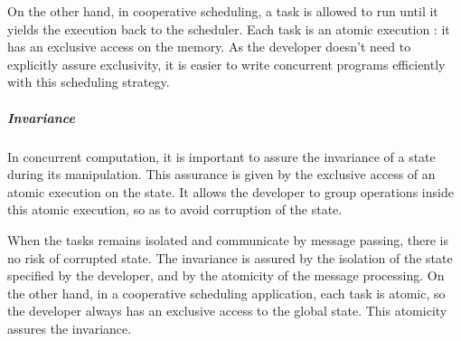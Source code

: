 On the other hand, in cooperative scheduling, a task is allowed to run until it yields the execution back to the scheduler.
Each task is an atomic execution : it has an exclusive access on the memory.
As the developer doesn't need to explicitly assure exclusivity, it is easier to write concurrent programs efficiently with this scheduling strategy.

\subparagraph{Invariance}


In concurrent computation, it is important to assure the invariance of a state during its manipulation.
This assurance is given by the exclusive access of an atomic execution on the state.
It allows the developer to group operations inside this atomic execution, so as to avoid corruption of the state.

When the tasks remains isolated and communicate by message passing, there is no risk of corrupted state.
The invariance is assured by the isolation of the state specified by the developer, and by the atomicity of the message processing.
On the other hand, in a cooperative scheduling application, each task is atomic, so the developer always has an exclusive access to the global state.
This atomicity assures the invariance.


